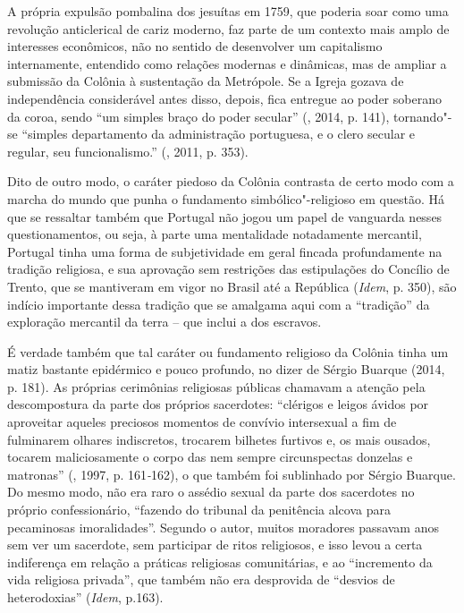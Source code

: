 A própria expulsão pombalina dos jesuítas em 1759, que poderia soar como
uma revolução anticlerical de cariz moderno, faz parte de um contexto
mais amplo de interesses econômicos, não no sentido de desenvolver um
capitalismo internamente, entendido como relações modernas e dinâmicas,
mas de ampliar a submissão da Colônia à sustentação da Metrópole. Se a
Igreja gozava de independência considerável antes disso, depois, fica
entregue ao poder soberano da coroa, sendo ``um simples braço do poder
secular'' (, 2014, p. 141), tornando"-se ``simples departamento da
administração portuguesa, e o clero secular e regular, seu
funcionalismo.'' (, 2011, p. 353).

Dito de outro modo, o caráter piedoso da Colônia contrasta de certo modo
com a marcha do mundo que punha o fundamento simbólico"-religioso em
questão. Há que se ressaltar também que Portugal não jogou um papel de
vanguarda nesses questionamentos, ou seja, à parte uma mentalidade
notadamente mercantil, Portugal tinha uma forma de subjetividade em
geral fincada profundamente na tradição religiosa, e sua aprovação sem
restrições das estipulações do Concílio de Trento, que se mantiveram em
vigor no Brasil até a República (\emph{Idem}, p. 350), são indício
importante dessa tradição que se amalgama aqui com a ``tradição'' da
exploração mercantil da terra -- que inclui a dos escravos.

É verdade também que tal caráter ou fundamento religioso da Colônia
tinha um matiz bastante epidérmico e pouco profundo, no dizer de Sérgio
Buarque (2014, p. 181). As próprias cerimônias religiosas públicas
chamavam a atenção pela descompostura da parte dos próprios sacerdotes:
``clérigos e leigos ávidos por aproveitar aqueles preciosos momentos de
convívio intersexual a fim de fulminarem olhares indiscretos, trocarem
bilhetes furtivos e, os mais ousados, tocarem maliciosamente o corpo das
nem sempre circunspectas donzelas e matronas'' (, 1997, p.
161\emph{-}162), o que também foi sublinhado por Sérgio Buarque.
Do mesmo modo, não era raro o assédio sexual da parte dos sacerdotes no
próprio confessionário, ``fazendo do tribunal da penitência alcova para
pecaminosas imoralidades''. Segundo o autor, muitos moradores passavam
anos sem ver um sacerdote, sem participar de ritos religiosos, e isso
levou a certa indiferença em relação a práticas religiosas comunitárias,
e ao ``incremento da vida religiosa privada'', que também não era
desprovida de ``desvios de heterodoxias'' (\emph{Idem}, p.163).

